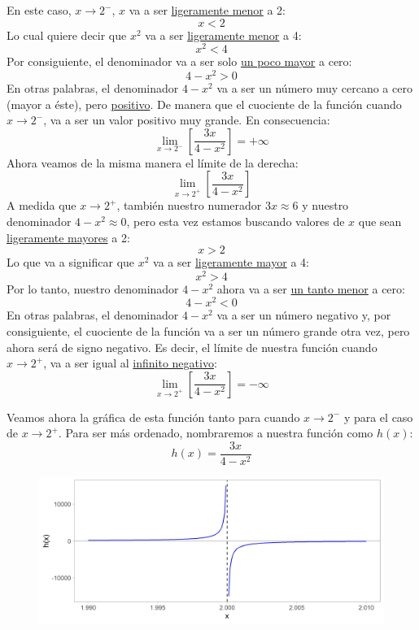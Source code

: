 \documentclass[12pt]{article}
\begin{document}
En este caso, $x \to 2^{-}$, $x$ va a ser \underline{ligeramente menor} a 2:
\[x < 2\]
Lo cual quiere decir que $x^{2}$ va a ser \underline{ligeramente menor} a 4:
\[x^{2} < 4\]
Por consiguiente, el denominador va a ser solo \underline{un poco mayor} a cero:
\[4 - x^{2} > 0\]
En otras palabras, el denominador $4 - x^{2}$ va a ser un número muy cercano a cero (mayor a éste), pero \underline{positivo}. De manera que el cuociente de la función cuando $x \to 2^{-}$, va a ser un valor positivo muy grande. En consecuencia:
\[\lim_{x \to 2^{-}}\left[\frac{3x}{4 - x^{2}}\right] = +\infty\]
Ahora veamos de la misma manera el límite de la derecha:
\[\lim_{x \to 2^{+}}\left[\frac{3x}{4 - x^{2}}\right]\]
A medida que $x \to 2^{+}$, también nuestro numerador $3x \approx 6$ y nuestro denominador $4 - x^{2} \approx 0$, pero esta vez estamos buscando valores de $x$ que sean \underline{ligeramente mayores} a 2:
\[x > 2\]
Lo que va a significar que $x^{2}$ va a ser \underline{ligeramente mayor} a 4:
\[x^{2} > 4\]
Por lo tanto, nuestro denominador $4 - x^{2}$ ahora va a ser \underline{un tanto menor} a cero:
\[4 - x^{2} < 0\]
En otras palabras, el denominador $4 - x^{2}$ va a ser un número negativo y, por consiguiente, el cuociente de la función va a ser un número grande otra vez, pero ahora será de signo negativo. Es decir, el límite de nuestra función cuando $x \to 2^{+}$, va a ser igual al \underline{infinito negativo}:
\[\lim_{x \to 2^{+}}\left[\frac{3x}{4 - x^{2}}\right] = - \infty\]

\newpage

Veamos ahora la gráfica de esta función tanto para cuando $x \to 2^{-}$ y para el caso de $x \to 2^{+}$. Para ser más ordenado, nombraremos a nuestra función como $h(x)$:
\[h(x) = \frac{3x}{4 - x^{2}}\]

\begin{figure}[hbt!]
\centering
\includegraphics[scale=0.7]{img/infinite_limit_plot_3.jpg}
\end{figure}
\end{document}
